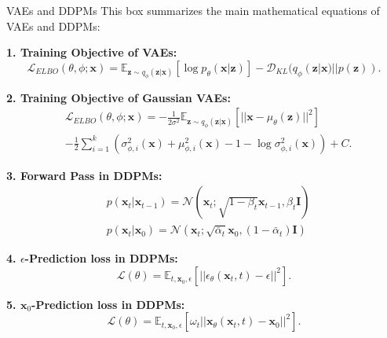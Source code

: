 \newpage
\begin{summarybox}[label={box:latent_math}]{VAEs and DDPMs}
    This box summarizes the main mathematical equations of VAEs and DDPMs:

    \medskip
    \textbf{1. Training Objective of VAEs:}
    \begin{equation}
        \mathcal{L}_{ELBO}(\theta, \phi; \mathbf{x}) = \mathbb{E}_{\mathbf{z}\sim q_{\phi}(\mathbf{z}|\mathbf{x})} \left[\log p_{\theta}(\mathbf{x}|\mathbf{z})\right] - \mathcal{D}_{KL}(q_{\phi}(\mathbf{z}|\mathbf{x}) || p(\mathbf{z})).
    \end{equation}

    \medskip
    \textbf{2. Training Objective of Gaussian VAEs:}
    \begin{align}
        &\mathcal{L}_{ELBO}(\theta, \phi; \mathbf{x}) = -\frac{1}{2\sigma^2} \mathbb{E}_{\mathbf{z}\sim q_{\phi}(\mathbf{z}|\mathbf{x})} \left[||\mathbf{x} - \mu_{\theta}(\mathbf{z})||^2\right] \\ 
        &- \frac{1}{2} \sum_{i=1}^k \left( \sigma^2_{\phi,i}(\mathbf{x}) + \mu^2_{\phi,i}(\mathbf{x}) - 1 - \log \sigma^2_{\phi,i}(\mathbf{x}) \right) + C.
    \end{align} 

    \medskip
    \textbf{3. Forward Pass in DDPMs:}
    \begin{align}
        & p(\mathbf{x}_t|\mathbf{x}_{t-1}) = \mathcal{N}(\mathbf{x}_t; \sqrt{1-\beta_t}\mathbf{x}_{t-1}, \beta_t\mathbf{I}) \\
        & p(\mathbf{x}_t|\mathbf{x}_0) = \mathcal{N}(\mathbf{x}_t; \sqrt{\bar{\alpha}_t}\mathbf{x}_0, (1-\bar{\alpha}_t)\mathbf{I})
    \end{align} 

    \medskip
    \textbf{4. $\epsilon$-Prediction loss in DDPMs:}
    \begin{equation}
        \mathcal{L}(\theta) = \mathbb{E}_{t, \mathbf{x}_0, \epsilon} \left[||\epsilon_{\theta}(\mathbf{x}_t, t) - \epsilon||^2 \right].
    \end{equation} 

    \medskip
    \textbf{5. $\mathbf{x}_0$-Prediction loss in DDPMs:}
    \begin{equation}
        \mathcal{L}(\theta) = \mathbb{E}_{t, \mathbf{x}_0, \epsilon} \left[\omega_t||\mathbf{x}_{\theta}(\mathbf{x}_t, t) - \mathbf{x}_0||^2 \right].
    \end{equation} 
    
\end{summarybox} 


